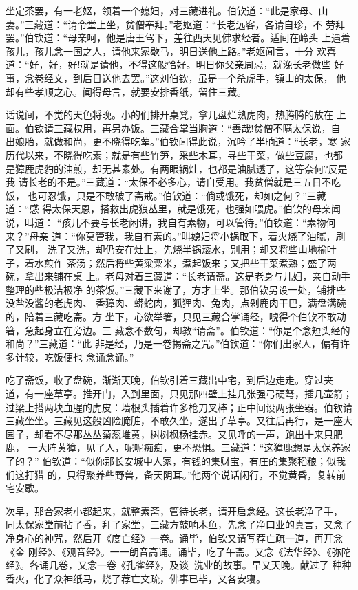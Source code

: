 坐定茶罢，有一老妪，领着一个媳妇，对三藏进礼。伯钦道：“此是家母、山
妻。”三藏道：“请令堂上坐，贫僧奉拜。”老妪道：“长老远客，各请自珍，不
劳拜罢。”伯钦道：“母亲呵，他是唐王驾下，差往西天见佛求经者。适间在岭头
上遇着孩儿，孩儿念一国之人，请他来家歇马，明日送他上路。”老妪闻言，十分
欢喜道：“好，好，好!就是请他，不得这般恰好。明日你父亲周忌，就浼长老做些
好事，念卷经文，到后日送他去罢。”这刘伯钦，虽是一个杀虎手，镇山的太保，
他却有些孝顺之心。闻得母言，就要安排香纸，留住三藏。

话说间，不觉的天色将晚。小的们排开桌凳，拿几盘烂熟虎肉，热腾腾的放在
上面。伯钦请三藏权用，再另办饭。三藏合掌当胸道：“善哉!贫僧不瞒太保说，自
出娘胎，就做和尚，更不晓得吃荤。”伯钦闻得此说，沉吟了半晌道：“长老，寒
家历代以来，不晓得吃素；就是有些竹笋，采些木耳，寻些干菜，做些豆腐，也都
是獐鹿虎豹的油煎，却无甚素处。有两眼锅灶，也都是油腻透了，这等奈何?反是我
请长老的不是。”三藏道：“太保不必多心，请自受用。我贫僧就是三五日不吃饭，
也可忍饿，只是不敢破了斋戒。”伯钦道：“倘或饿死，却如之何？”三藏道：“感
得太保天恩，搭救出虎狼丛里，就是饿死，也强如喂虎。”伯钦的母亲闻说，叫道：
“孩儿不要与长老闲讲，我自有素物，可以管待。”伯钦道：“素物何来？”母亲
道：“你莫管我，我自有素的。”叫媳妇将小锅取下，着火烧了油腻，刷了又刷，
洗了又洗，却仍安在灶上，先烧半锅滚水，别用；却又将些山地榆叶子，着水煎作
茶汤；然后将些黄粱粟米，煮起饭来；又把些干菜煮熟；盛了两碗，拿出来铺在桌
上。老母对着三藏道：“长老请斋。这是老身与儿妇，亲自动手整理的些极洁极净
的茶饭。”三藏下来谢了，方才上坐。那伯钦另设一处，铺排些没盐没酱的老虎肉、
香獐肉、蟒蛇肉，狐狸肉、兔肉，点剁鹿肉干巴，满盘满碗的，陪着三藏吃斋。方
坐下，心欲举箸，只见三藏合掌诵经，唬得个伯钦不敢动箸，急起身立在旁边。三
藏念不数句，却教“请斋”。伯钦道：“你是个念短头经的和尚？”三藏道：“此
非是经，乃是一卷揭斋之咒。”伯钦道：“你们出家人，偏有许多计较，吃饭便也
念诵念诵。”

吃了斋饭，收了盘碗，渐渐天晚，伯钦引着三藏出中宅，到后边走走。穿过夹
道，有一座草亭。推开门，入到里面，只见那四壁上挂几张强弓硬弩，插几壶箭；
过梁上搭两块血腥的虎皮：墙根头插着许多枪刀叉棒；正中间设两张坐器。伯钦请
三藏坐坐。三藏见这般凶险腌脏，不敢久坐，遂出了草亭。又往后再行，是一座大
园子，却看不尽那丛丛菊蕊堆黄，树树枫杨挂赤。又见呼的一声，跑出十来只肥鹿，
一大阵黄獐，见了人，呢呢痴痴，更不恐惧。三藏道：“这獐鹿想是太保养家了的？”
伯钦道：“似你那长安城中人家，有钱的集财宝，有庄的集聚稻粮；似我们这打猎
的，只得聚养些野兽，备天阴耳。”他两个说话闲行，不觉黄昏，复转前宅安歇。

次早，那合家老小都起来，就整素斋，管待长老，请开启念经。这长老净了手，
同太保家堂前拈了香，拜了家堂，三藏方敲响木鱼，先念了净口业的真言，又念了
净身心的神咒，然后开《度亡经》一卷。诵毕，伯钦又请写荐亡疏一道，再开念《金
刚经》、《观音经》。一一朗音高诵。诵毕，吃了午斋。又念《法华经》、《弥陀
经》。各诵几卷，又念一卷《孔雀经》，及谈洗业的故事。早又天晚。献过了
种种香火，化了众神纸马，烧了荐亡文疏，佛事已毕，又各安寝。

